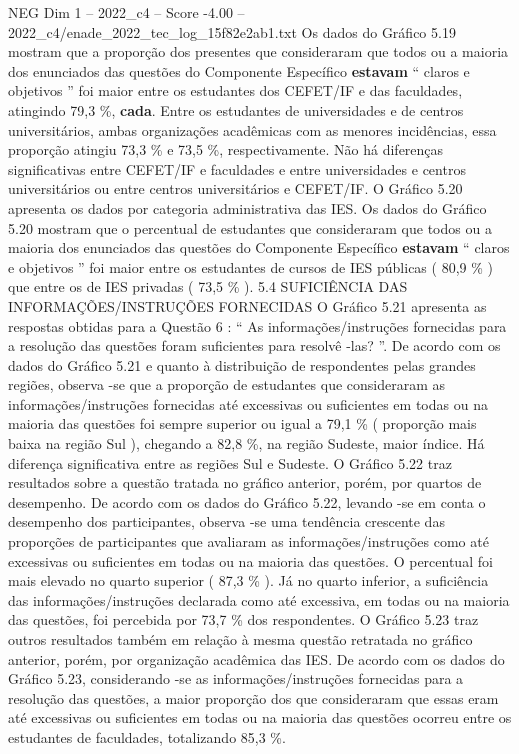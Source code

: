 \begin{textsample}{NEG Dim 1 – 2022\_c4 – Score -4.00 – 2022\_c4/enade\_2022\_tec\_log\_15f82e2ab1.txt}
Os dados do Gráfico 5.19 mostram que a proporção dos presentes que consideraram que todos ou a maioria dos enunciados das questões do Componente Específico \textbf{estavam} “ claros e objetivos ” foi maior entre os estudantes dos CEFET/IF e das faculdades, atingindo 79,3 \%, \textbf{cada}.
Entre os estudantes de universidades e de centros universitários, ambas organizações acadêmicas com as menores incidências, essa proporção atingiu 73,3 \% e 73,5 \%, respectivamente.
Não há diferenças significativas entre CEFET/IF e faculdades e entre universidades e centros universitários ou entre centros universitários e CEFET/IF.
O Gráfico 5.20 apresenta os dados por categoria administrativa das IES.
Os dados do Gráfico 5.20 mostram que o percentual de estudantes que consideraram que todos ou a maioria dos enunciados das questões do Componente Específico \textbf{estavam} “ claros e objetivos ” foi maior entre os estudantes de cursos de IES públicas ( 80,9 \% ) que entre os de IES privadas ( 73,5 \% ). 5.4 SUFICIÊNCIA DAS INFORMAÇÕES/INSTRUÇÕES FORNECIDAS O Gráfico 5.21 apresenta as respostas obtidas para a Questão 6 : “ As informações/instruções fornecidas para a resolução das questões foram suficientes para resolvê -las? ”.
De acordo com os dados do Gráfico 5.21 e quanto à distribuição de respondentes pelas grandes regiões, observa -se que a proporção de estudantes que consideraram as informações/instruções fornecidas até excessivas ou suficientes em todas ou na maioria das questões foi sempre superior ou igual a 79,1 \% ( proporção mais baixa na região Sul ), chegando a 82,8 \%, na região Sudeste, maior índice.
Há diferença significativa entre as regiões Sul e Sudeste.
O Gráfico 5.22 traz resultados sobre a questão tratada no gráfico anterior, porém, por quartos de desempenho.
De acordo com os dados do Gráfico 5.22, levando -se em conta o desempenho dos participantes, observa -se uma tendência crescente das proporções de participantes que avaliaram as informações/instruções como até excessivas ou suficientes em todas ou na maioria das questões.
O percentual foi mais elevado no quarto superior ( 87,3 \% ).
Já no quarto inferior, a suficiência das informações/instruções declarada como até excessiva, em todas ou na maioria das questões, foi percebida por 73,7 \% dos respondentes.
O Gráfico 5.23 traz outros resultados também em relação à mesma questão retratada no gráfico anterior, porém, por organização acadêmica das IES.
De acordo com os dados do Gráfico 5.23, considerando -se as informações/instruções fornecidas para a resolução das questões, a maior proporção dos que consideraram que essas eram até excessivas ou suficientes em todas ou na maioria das questões ocorreu entre os estudantes de faculdades, totalizando 85,3 \%.

\end{textsample}
